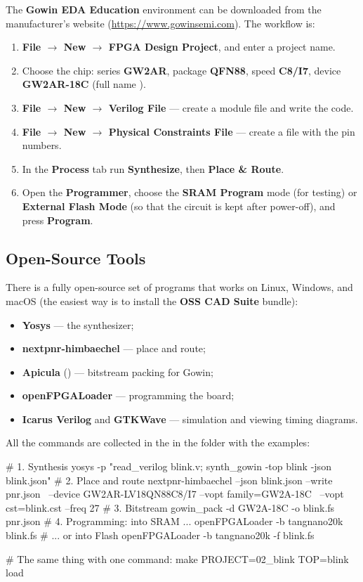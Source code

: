 The \textbf{Gowin EDA Education} environment can be downloaded from the manufacturer's
website (\url{https://www.gowinsemi.com}). The workflow is:
\begin{enumerate}
  \item \textbf{File $\to$ New $\to$ FPGA Design Project}, and enter a project name.
  \item Choose the chip: series \textbf{GW2AR}, package \textbf{QFN88},
        speed \textbf{C8/I7}, device \textbf{GW2AR-18C}
        (full name ).
  \item \textbf{File $\to$ New $\to$ Verilog File} --- create a module file
        and write the code.
  \item \textbf{File $\to$ New $\to$ Physical Constraints File} --- create
        a  file with the pin numbers.
  \item In the \textbf{Process} tab run \textbf{Synthesize}, then
        \textbf{Place \& Route}.
  \item Open the \textbf{Programmer}, choose the \textbf{SRAM Program} mode
        (for testing) or \textbf{External Flash Mode} (so that the circuit
        is kept after power-off), and press \textbf{Program}.
\end{enumerate}

\subsection{Open-Source Tools}

There is a fully open-source set of programs that works on Linux, Windows, and macOS
(the easiest way is to install the \textbf{OSS CAD Suite} bundle):
\begin{itemize}
  \item \textbf{Yosys} --- the synthesizer;
  \item \textbf{nextpnr-himbaechel} --- place and route;
  \item \textbf{Apicula} () --- bitstream packing for Gowin;
  \item \textbf{openFPGALoader} --- programming the board;
  \item \textbf{Icarus Verilog} and \textbf{GTKWave} --- simulation and
        viewing timing diagrams.
\end{itemize}

All the commands are collected in the  in the folder with the examples:
\begin{vcode}[bash]
# 1. Synthesis
yosys -p "read_verilog blink.v; synth_gowin -top blink -json blink.json"
# 2. Place and route
nextpnr-himbaechel --json blink.json --write pnr.json \
    --device GW2AR-LV18QN88C8/I7 --vopt family=GW2A-18C \
    --vopt cst=blink.cst --freq 27
# 3. Bitstream
gowin_pack -d GW2A-18C -o blink.fs pnr.json
# 4. Programming: into SRAM ...
openFPGALoader -b tangnano20k blink.fs
# ... or into Flash
openFPGALoader -b tangnano20k -f blink.fs

# The same thing with one command:
make PROJECT=02_blink TOP=blink load
\end{vcode}

